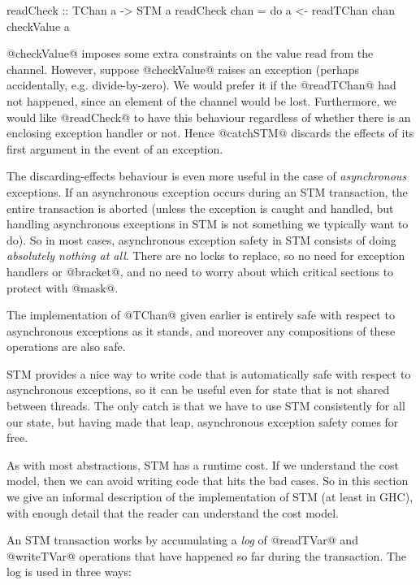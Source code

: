 \begin{haskell}
readCheck :: TChan a -> STM a
readCheck chan = do
  a <- readTChan chan
  checkValue a
\end{haskell}

\noindent @checkValue@ imposes some extra constraints on the value
read from the channel.  However, suppose @checkValue@ raises an
exception (perhaps accidentally, e.g. divide-by-zero).  We would
prefer it if the @readTChan@ had not happened, since an element of the
channel would be lost.  Furthermore, we would like @readCheck@ to have
this behaviour regardless of whether there is an enclosing exception
handler or not.  Hence @catchSTM@ discards the effects of its first
argument in the event of an exception.

The discarding-effects behaviour is even more useful in the case of
\emph{asynchronous} exceptions.  If an asynchronous exception occurs
during an STM transaction, the entire transaction is aborted (unless
the exception is caught and handled, but handling asynchronous
exceptions in STM is not something we typically want to do).  So in
most cases, asynchronous exception safety in STM consists of doing
\emph{absolutely nothing at all}.  There are no locks to replace, so
no need for exception handlers or @bracket@, and no need to worry
about which critical sections to protect with @mask@.

The implementation of @TChan@ given earlier is entirely safe with
respect to asynchronous exceptions as it stands, and moreover any
compositions of these operations are also safe.

STM provides a nice way to write code that is automatically safe with
respect to asynchronous exceptions, so it can be useful even for state
that is not shared between threads.  The only catch is that we have to
use STM consistently for all our state, but having made that leap,
asynchronous exception safety comes for free.


As with most abstractions, STM has a runtime cost.  If we understand
the cost model, then we can avoid writing code that hits the bad
cases.  So in this section we give an informal description of the
implementation of STM (at least in GHC), with enough detail that the
reader can understand the cost model.

An STM transaction works by accumulating a \emph{log} of @readTVar@
and @writeTVar@ operations that have happened so far during the
transaction.  The log is used in three ways:

